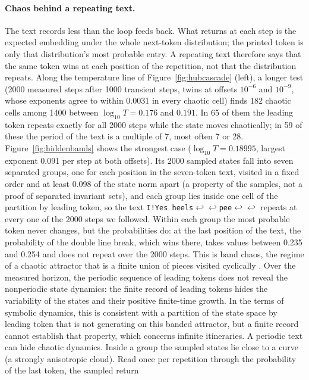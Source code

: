\documentclass[11pt,letterpaper]{article}
\begin{document}
\paragraph{Chaos behind a repeating text.} The text records less than the loop feeds back. What returns at each step
is the expected embedding under the whole next-token distribution; the printed token is only that distribution's most
probable entry. A repeating text therefore says that the same token wins at each position of the repetition, not that
the distribution repeats. Along the temperature line of Figure~\ref{fig:hubcascade} (left), a longer
test (2000 measured steps after 1000 transient steps, twins at offsets $10^{-6}$ and $10^{-9}$, whose exponents agree
to within 0.0031 in every chaotic cell) finds 182 chaotic cells among 1400 between $\log_{10}T=0.176$ and $0.191$. In
65 of them the leading token repeats exactly for all 2000 steps while the state moves chaotically; in 59 of these the
period of the text is a multiple of 7, most often 7 or 28. Figure~\ref{fig:hiddenbands} shows the strongest case
($\log_{10}T=0.18995$, largest exponent 0.091 per step at both offsets). Its 2000 sampled states fall into seven
separated groups, one for each position in the seven-token text, visited in a fixed order and at least 0.098 of the state norm apart (a property of
the samples, not a proof of separated invariant sets), and each group lies inside one cell of the partition by leading
token, so the text \texttt{I!Yes\ heels$\hookleftarrow\hookleftarrow$pee$\hookleftarrow\hookleftarrow$}
repeats at every one of the 2000 steps we followed. Within each group the most probable token never changes, but
the probabilities do: at the last position of the text, the probability of the double line break, which wins there,
takes values between 0.235 and 0.254 and does not repeat over the 2000 steps. This is band chaos, the regime of a
chaotic attractor that is a finite union of pieces visited cyclically \cite{grossmann1977invariant,lorenz1980noisy}.
Over the measured horizon, the periodic sequence of leading tokens does not reveal the nonperiodic state dynamics: the
finite record of leading tokens hides the variability of the states and their positive finite-time growth. In the
terms of symbolic dynamics, this is consistent with a partition of the state space by leading token that is not
generating on this banded attractor, but a finite record cannot establish that property, which concerns infinite
itineraries. A periodic text can hide chaotic dynamics. Inside a group the sampled states lie close to a curve (a
strongly anisotropic cloud). Read once per repetition through the probability of the last token, the sampled return
\end{document}
